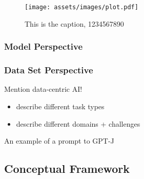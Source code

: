 \begin{figure}
	\centering
	\texttt{[image: assets/images/plot.pdf]}
	\caption{This is the caption, 1234567890}
\end{figure}

\subsubsection{Model Perspective}
\subsubsection{Data Set Perspective}
Mention data-centric AI!
\begin{itemize}[noitemsep]
	\item describe different task types
	\item describe different domains + challenges
\end{itemize}



An example of a prompt to GPT-J \cite{gpt-j}



\subsection{Conceptual Framework}

